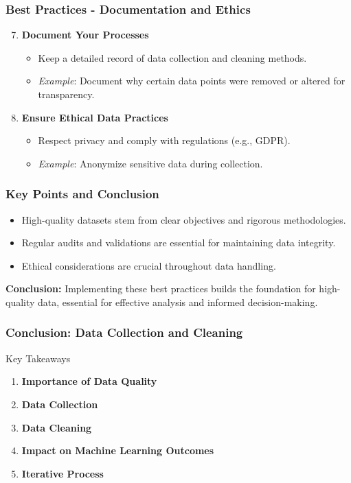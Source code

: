 \documentclass[aspectratio=169]{beamer}
\begin{document}
\begin{frame}[fragile]
    \frametitle{Best Practices - Documentation and Ethics}
    \begin{enumerate}
        \setcounter{enumi}{6}
        \item \textbf{Document Your Processes}
        \begin{itemize}
            \item Keep a detailed record of data collection and cleaning methods.
            \item \textit{Example}: Document why certain data points were removed or altered for transparency.
        \end{itemize}

        \item \textbf{Ensure Ethical Data Practices}
        \begin{itemize}
            \item Respect privacy and comply with regulations (e.g., GDPR).
            \item \textit{Example}: Anonymize sensitive data during collection.
        \end{itemize}
    \end{enumerate}
\end{frame}

\begin{frame}[fragile]
    \frametitle{Key Points and Conclusion}
    \begin{itemize}
        \item High-quality datasets stem from clear objectives and rigorous methodologies.
        \item Regular audits and validations are essential for maintaining data integrity.
        \item Ethical considerations are crucial throughout data handling.
    \end{itemize}

    \textbf{Conclusion:} Implementing these best practices builds the foundation for high-quality data, essential for effective analysis and informed decision-making.
\end{frame}

\begin{frame}[fragile]
    \frametitle{Conclusion: Data Collection and Cleaning}
    \begin{block}{Key Takeaways}
        \begin{enumerate}
            \item \textbf{Importance of Data Quality}
            \item \textbf{Data Collection}
            \item \textbf{Data Cleaning}
            \item \textbf{Impact on Machine Learning Outcomes}
            \item \textbf{Iterative Process}
        \end{enumerate}
    \end{block}
\end{frame}
\end{document}
